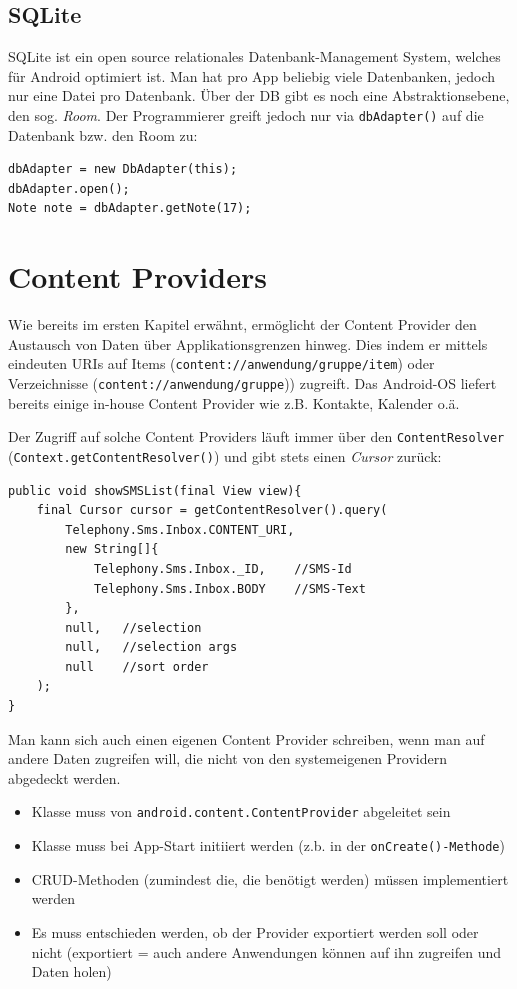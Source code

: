 \documentclass[a4paper, 11pt]{article}
\newcommand{\code}[1]{\texttt{#1}}
\begin{document}
\subsection{SQLite}
SQLite ist ein open source relationales Datenbank-Management System, welches für Android optimiert ist. Man hat pro App beliebig viele Datenbanken, jedoch nur eine Datei pro Datenbank. Über der DB gibt es noch eine Abstraktionsebene, den sog. \textit{Room}. Der Programmierer greift jedoch nur via \code{dbAdapter()} auf die Datenbank bzw. den Room zu:

\begin{lstlisting}[caption={Anwendung des dbAdapters}]
dbAdapter = new DbAdapter(this);
dbAdapter.open();
Note note = dbAdapter.getNote(17);
\end{lstlisting}  


\section{Content Providers}
Wie bereits im ersten Kapitel erwähnt, ermöglicht der Content Provider den Austausch von Daten über Applikationsgrenzen hinweg. Dies indem er mittels eindeuten URIs auf Items (\code{content://anwendung/gruppe/item}) oder Verzeichnisse (\code{content://anwendung/gruppe})) zugreift. Das Android-OS liefert bereits einige in-house Content Provider wie z.B. Kontakte, Kalender o.ä. 

Der Zugriff auf solche Content Providers läuft immer über den \code{ContentResolver} \\ (\code{Context.getContentResolver()}) und gibt stets einen \textit{Cursor} zurück:

\begin{lstlisting}[caption={Auslesen aller SMS mittels Content Provider}]
public void showSMSList(final View view){
	final Cursor cursor = getContentResolver().query(
		Telephony.Sms.Inbox.CONTENT_URI,
		new String[]{
			Telephony.Sms.Inbox._ID,	//SMS-Id
			Telephony.Sms.Inbox.BODY	//SMS-Text
		},
		null,	//selection
		null,	//selection args
		null	//sort order
	);
}
\end{lstlisting}
\vspace{10px}

\noindent Man kann sich auch einen eigenen Content Provider schreiben, wenn man auf andere Daten zugreifen will, die nicht von den systemeigenen Providern abgedeckt werden. 

\begin{itemize}
	\item Klasse muss von \code{android.content.ContentProvider} abgeleitet sein
	\item Klasse muss bei App-Start initiiert werden (z.b. in der \code{onCreate()-Methode})
	\item CRUD-Methoden (zumindest die, die benötigt werden) müssen implementiert werden
	\item Es muss entschieden werden, ob der Provider exportiert werden soll oder nicht (exportiert = auch andere Anwendungen können auf ihn zugreifen und Daten holen)
\end{itemize}
\end{document}
